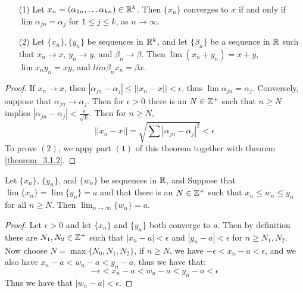 \begin{theorem}\label{3.1.3}
  \begin{enumerate}
    \item[(1)] Let $x_n=(\alpha_{1n}, \dots \alpha_{kn}) \in \mathbb{R}^k$. Then
      $\{x_n\}$ converges to  $x$ if and only if $\lim{\alpha_{jn}}=\alpha_j$ for
      $1 \leq j \leq k$, as  $n \rightarrow \infty$.

    \item[(2)] Let $\{x_n\},\{y_n\}$ be sequences in  $\mathbb{R}^k$, and let
      $\{\beta_n\}$ be a sequence in  $\mathbb{R}$  such that $x_n \rightarrow x$,
      $y_n \rightarrow y$, and  $\beta_n \rightarrow \beta$. Then
      $\lim{(x_n+y_n)}=x+y$, $\lim{x_ny_n}=xy$, and  $lim{\beta_nx_n}=\beta x$.
  \end{enumerate}
\end{theorem}
\begin{proof}
  If $x_n \rightarrow x$, then  $|\alpha_{jn}-\alpha_j| \leq ||x_n-x||<\epsilon$,
  thus $\lim{\alpha_{jn}}=\alpha_j$. Conversely, suppose that $\alpha_{jn}
  \rightarrow \alpha_j$. Then for $\epsilon>0$ there is an $N \in \mathbb{Z}^+$ such that
  $n \geq N$ implies $|\alpha_{jn}-\alpha_j|<\frac{\epsilon}{\sqrt{k}}$. Then for
  $n \geq N$,
  \begin{equation*}
    ||x_n-x||=\sqrt{\sum{|\alpha_{jn}-\alpha_j|^2}}<\epsilon
  \end{equation*}
  To prove $(2)$, we appy part $(1)$ of this theorem together with theorem
  \ref{theorem_3.1.2}.
\end{proof}

\begin{theorem}\label{theorem_3.1.4}
  Let $\{x_n\}$, $\{y_n\}$, and  $\{w_n\}$ be sequences in $\mathbb{R}$, and  Suppose that
  $\lim{\{x_n\}}=\lim{\{y_n\}}=a$ and that there is an $N \in \mathbb{Z}^+$ such that
  $x_n \leq w_n \leq y_n$ for all  $n \geq N$. Then
  $\lim_{n \rightarrow \infty}{\{w_n\}}=a$.
\end{theorem}
\begin{proof}
  Let $\epsilon>0$ and let  $\{x_n\}$ and  $\{y_n\}$ both converge to  $a$. Then
  by definition there are  $N_1,N_2 \in \mathbb{Z}^+$ such that $|x_n-a|<\epsilon$ and
  $|y_n-a|<\epsilon$ for  $n \geq N_1,N_2$. Now choose $N=\max\{N_0,N_1,N_2\}$, if
  $n \geq N$, we have  $-\epsilon<x_n-a<\epsilon$, and we also have
  $x_n-a<w_n-a<y_n-a$, thus we have that:
  \begin{equation*}
    -\epsilon<x_n-a<w_n-a<y_n-a<\epsilon
  \end{equation*}
  Thus we have that $|w_n-a|<\epsilon$.
\end{proof}


